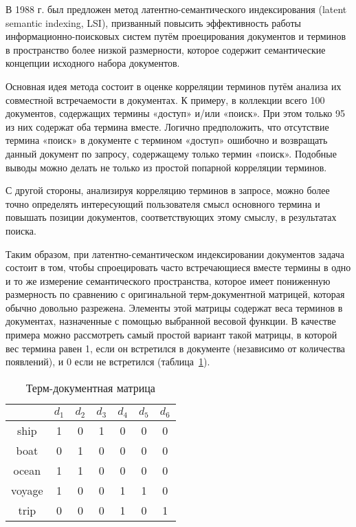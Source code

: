 В 1988 г. был предложен метод латентно-семантического индексирования (latent semantic indexing, LSI), призванный повысить эффективность работы информационно-поисковых систем путём проецирования документов и терминов в пространство более низкой размерности, которое содержит семантические концепции исходного набора документов. 

Основная идея метода состоит в оценке корреляции терминов путём анализа их совместной встречаемости в документах. К примеру, в коллекции всего 100 документов, содержащих термины «доступ» \mbox{и/или} «поиск». При этом только 95 из них содержат оба термина вместе. Логично предположить, что отсутствие термина «поиск» в документе с термином «доступ» ошибочно и возвращать данный документ по запросу, содержащему только термин «поиск». Подобные выводы можно делать не только из простой попарной корреляции терминов. 

С другой стороны, анализируя корреляцию терминов в запросе, можно более точно определять интересующий пользователя смысл основного термина и повышать позиции документов, соответствующих этому смыслу, в результатах поиска.
 
Таким образом, при латентно-семантическом индексировании документов задача состоит в том, чтобы спроецировать часто встречающиеся вместе термины в одно и то же измерение семантического пространства, которое имеет пониженную размерность по сравнению с оригинальной терм-документной матрицей, которая обычно довольно разрежена. Элементы этой матрицы содержат веса терминов в документах, назначенные с помощью выбранной весовой функции. В качестве примера можно рассмотреть самый простой вариант такой матрицы, в которой вес термина равен 1, если он встретился в документе (независимо от количества появлений), и 0 если не встретился (таблица~\ref{td_matr}).
 
\begin{table}[h]
\caption{Терм-документная матрица}
\label{td_matr}
\centering
\begin{tabular}{c|cccccc}
 & $d_1$ & $d_2$ & $d_3$ & $d_4$ & $d_5$ & $d_6$ \\
\hline
ship & 1 & 0 & 1 & 0 & 0 & 0 \\
boat & 0 & 1 & 0 & 0 & 0 & 0 \\
ocean & 1 & 1 & 0 & 0 & 0 & 0 \\
voyage & 1 & 0 & 0 & 1 & 1 & 0 \\
trip & 0 & 0 & 0 & 1 & 0 & 1 \\
\end{tabular}
\end{table}

